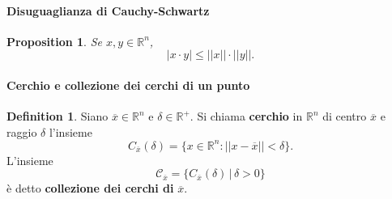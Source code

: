 \documentclass{article}
\theoremstyle{plain}
\newtheorem{prop}[thm]{Proposition}
\theoremstyle{definition}
\newtheorem{defn}{Definition}[section]
\theoremstyle{remark}
\begin{document}
\vspace{10pt}

\paragraph{Disuguaglianza di Cauchy-Schwartz}
\begin{bxthm}
\begin{prop}
    Se $x,y\in\mathbb{R}^n$, \[|x\cdot y|\leq ||x||\cdot||y||.\]
\end{prop}
\end{bxthm}

\vspace{10pt}


\paragraph{Cerchio e collezione dei cerchi di un punto}
\begin{bxthm}
\begin{defn}
    Siano $\overline{x}\in\mathbb{R}^n$ e $\delta\in\mathbb{R}^+$. 
    Si chiama \textbf{cerchio} in $\mathbb{R}^n$ di centro $\overline{x}$ e raggio $\delta$ l'insieme 
    \[C_{\overline{x}}(\delta)=\{x\in\mathbb{R}^n:||x-\overline{x}||<\delta\}.\]
    L'insieme \[\mathcal{C}_{\overline{x}}=\{C_{\overline{x}}(\delta) \,|\, \delta>0\}\] è detto \textbf{collezione dei cerchi di} $\overline{x}$.
\end{defn}
\end{bxthm}

\vspace{10pt}
\end{document}
